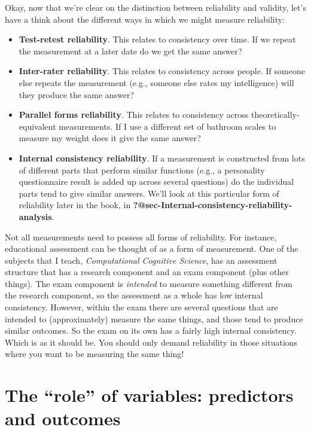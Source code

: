 \documentclass[
  a4paper,
]{book}
\providecommand{\tightlist}{%
  \setlength{\itemsep}{0pt}\setlength{\parskip}{0pt}}\usepackage{longtable,booktabs,array}
\begin{document}
Okay, now that we're clear on the distinction between reliability and
validity, let's have a think about the different ways in which we might
measure reliability:

\begin{itemize}
\tightlist
\item
  \textbf{Test-retest reliability}. This relates to consistency over
  time. If we repeat the measurement at a later date do we get the same
  answer?
\item
  \textbf{Inter-rater reliability}. This relates to consistency across
  people. If someone else repeats the measurement (e.g., someone else
  rates my intelligence) will they produce the same answer?
\item
  \textbf{Parallel forms reliability}. This relates to consistency
  across theoretically-equivalent measurements. If I use a different set
  of bathroom scales to measure my weight does it give the same answer?
\item
  \textbf{Internal consistency reliability}. If a measurement is
  constructed from lots of different parts that perform similar
  functions (e.g., a personality questionnaire result is added up across
  several questions) do the individual parts tend to give similar
  answers. We'll look at this particular form of reliability later in
  the book, in \textbf{?@sec-Internal-consistency-reliability-analysis}.
\end{itemize}

Not all measurements need to possess all forms of reliability. For
instance, educational assessment can be thought of as a form of
measurement. One of the subjects that I teach, \emph{Computational
Cognitive Science}, has an assessment structure that has a research
component and an exam component (plus other things). The exam component
is \emph{intended} to measure something different from the research
component, so the assessment as a whole has low internal consistency.
However, within the exam there are several questions that are intended
to (approximately) measure the same things, and those tend to produce
similar outcomes. So the exam on its own has a fairly high internal
consistency. Which is as it should be. You should only demand
reliability in those situations where you want to be measuring the same
thing!

\hypertarget{the-role-of-variables-predictors-and-outcomes}{%
\section{The ``role'' of variables: predictors and
outcomes}\label{the-role-of-variables-predictors-and-outcomes}}
\end{document}
